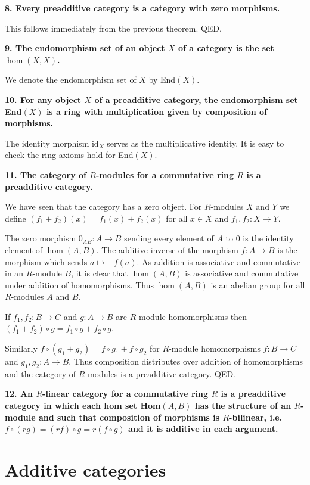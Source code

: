 \documentclass[12pt]{article}
\begin{document}
\textbf{8. Every preadditive category is a category with zero morphisms.}

This follows immediately from the previous theorem. QED.

\textbf{9. The endomorphism set of an object $X$ of a category is the set $\hom(X, X)$.}

We denote the endomorphism set of $X$ by End$(X)$.

\textbf{10. For any object $X$ of a preadditive category, the endomorphism set End$(X)$ is a ring with multiplication given by composition of morphisms.}

The identity morphism id$_X$ serves as the multiplicative identity. It is easy to check the ring axioms hold for End$(X)$.

\textbf{11. The category of $R$-modules for a commutative ring $R$ is a preadditive category.}

We have seen that the category has a zero object. For $R$-modules $X$ and $Y$ we define $(f_1 + f_2)(x) = f_1(x) + f_2(x)$ for all $x \in X$ and $f_1, f_2 : X \to Y$. 

The zero morphism $0_{AB} : A \to B$ sending every element of $A$ to $0$ is the identity element of $\hom(A, B)$. The additive inverse of the morphism $f : A \to B$ is the morphism which sends $a \mapsto -f(a)$. As addition is associative and commutative in an $R$-module $B$, it is clear that $\hom(A, B)$ is associative and commutative under addition of homomorphisms. Thus $\hom(A, B)$ is an abelian group for all $R$-modules $A$ and $B$.

If $f_1, f_2 : B \to C$ and $g : A \to B$ are $R$-module homomorphisms then $(f_1 + f_2)\circ g = f_1\circ g + f_2\circ g$.

Similarly $f\circ (g_1 + g_2) = f\circ g_1 + f\circ g_2$ for $R$-module homomorphisms $f : B \to C$ and $g_1, g_2 : A \to B$. Thus composition distributes over addition of homomorphisms and the category of $R$-modules is a preadditive category. QED.

\textbf{12. An $R$-linear category for a commutative ring $R$ is a preadditive category in which each hom set Hom$(A, B)$ has the structure of an $R$-module and such that composition of morphisms is $R$-bilinear, i.e. $f\circ (rg) = (rf)\circ g = r(f\circ g)$ and it is additive in each argument.}

\section{Additive categories}
\end{document}
